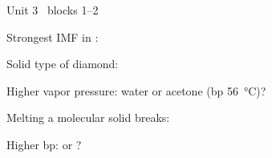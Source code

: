 \documentclass{apchem-worksheet}
\begin{document}
\begin{spiralstrip}{Unit 3 \textbullet\ blocks 1--2}
  \item Strongest IMF in : 
  \item Solid type of diamond: 
  \item Higher vapor pressure: water or acetone (bp \SI{56}{\celsius})?
  \item Melting a molecular solid breaks:
  \item Higher bp:  or ? 
\end{spiralstrip}
\end{document}

